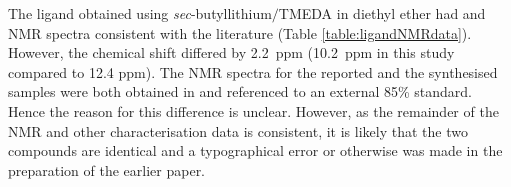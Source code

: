 The \tBuxantphos{} ligand obtained using \emph{sec}-butyllithium$/$TMEDA in diethyl ether had \proton{} and \carbon{} NMR spectra consistent with the literature (Table \ref{table:ligandNMRdata}).\cite{Mispelaere2005} However, the \phosphorus{} chemical shift differed by 2.2~ppm (10.2~ppm in this study compared to 12.4 ppm).  The NMR spectra for the reported and the synthesised samples were both obtained in  and referenced to an external 85\%  standard.  Hence the reason for this difference is unclear.  However, as the remainder of the NMR and other characterisation data is consistent, it is likely that the two compounds are identical and a typographical error or otherwise was made in the preparation of the earlier paper.






